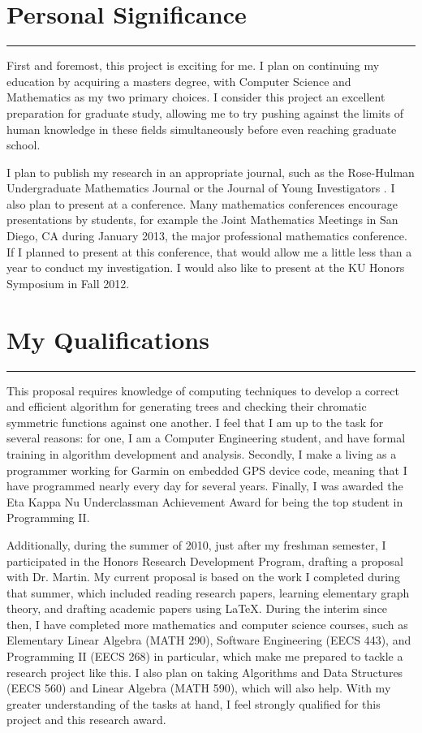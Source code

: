 \documentclass[a4paper,12pt]{article}
\begin{document}
\begin{spacing}{1}
\section*{\Large Personal Significance}
\hrule
\vspace{0.4cm}
First and foremost, this project is exciting for me. I plan on continuing my education by acquiring a masters degree, with Computer Science and Mathematics as my two primary choices. I consider this project an excellent preparation for graduate study, allowing me to try pushing against the limits of human knowledge in these fields simultaneously before even reaching graduate school.

I plan to publish my research in an appropriate journal, such as the Rose-Hulman Undergraduate Mathematics Journal \cite{rosehulman} or the Journal of Young Investigators \cite{jyi}. I also plan to present at a conference. Many mathematics conferences encourage presentations by students, for example the Joint Mathematics Meetings in San Diego, CA during January 2013, the major professional mathematics conference. If I planned to present at this conference, that would allow me a little less than a year to conduct my investigation. I would also like to present at the KU Honors Symposium in Fall 2012.

\section*{\Large My Qualifications}
\hrule
\vspace{0.4cm}
This proposal requires knowledge of computing techniques to develop a correct and efficient algorithm for generating trees and checking their chromatic symmetric functions against one another. I feel that I am up to the task for several reasons: for one, I am a Computer Engineering student, and have formal training in algorithm development and analysis. Secondly, I make a living as a programmer working for Garmin on embedded GPS device code, meaning that I have programmed nearly every day for several years. Finally, I was awarded the Eta Kappa Nu Underclassman Achievement Award for being the top student in Programming II.

Additionally, during the summer of 2010, just after my freshman semester, I participated in the Honors Research Development Program, drafting a proposal with Dr. Martin. My current proposal is based on the work I completed during that summer, which included reading research papers, learning elementary graph theory, and drafting academic papers using \LaTeX. During the interim since then, I have completed more mathematics and computer science courses, such as Elementary Linear Algebra (MATH 290), Software Engineering (EECS 443), and Programming II (EECS 268) in particular, which make me prepared to tackle a research project like this. I also plan on taking Algorithms and Data Structures (EECS 560) and Linear Algebra (MATH 590), which will also help. With my greater understanding of the tasks at hand, I feel strongly qualified for this project and this research award.

\end{spacing}

\pagebreak


\end{document}
